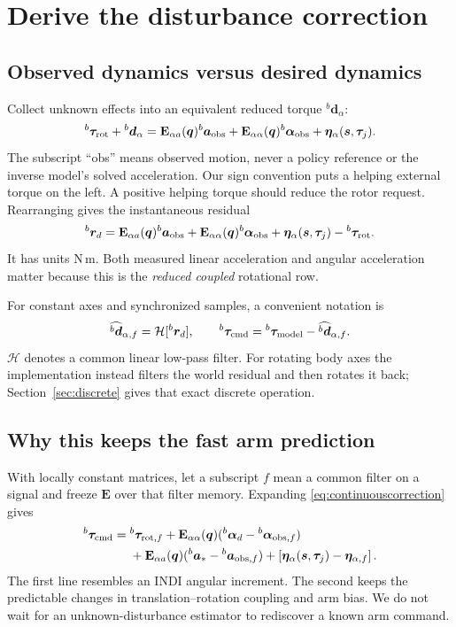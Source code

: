 \documentclass[11pt,a4paper]{article}
\newcommand{\vct}[1]{\boldsymbol{#1}}
\newcommand{\mat}[1]{\mathbf{#1}}
\newcommand{\bv}[1]{{}^{b}\vct{#1}}
\begin{document}
\section{Derive the disturbance correction}\label{sec:residual}

\subsection{Observed dynamics versus desired dynamics}
Collect unknown effects into an equivalent reduced torque $\bv d_\alpha$:
\begin{equation}
\bv\tau_{\rm rot}+\bv d_\alpha=
\mat E_{\alpha a}(\vct q)\bv a_{\rm obs}
+\mat E_{\alpha\alpha}(\vct q)\bv\alpha_{\rm obs}
+\vct\eta_\alpha(\vct s,\vct\tau_j).
\label{eq:observedbalance}
\end{equation}
The subscript ``obs'' means observed motion, never a policy reference or the
inverse model's solved acceleration. Our sign convention puts a helping external
torque on the left. A positive helping torque should reduce the rotor request.
Rearranging gives the instantaneous residual
\begin{equation}
\bv r_d=
\mat E_{\alpha a}(\vct q)\bv a_{\rm obs}
+\mat E_{\alpha\alpha}(\vct q)\bv\alpha_{\rm obs}
+\vct\eta_\alpha(\vct s,\vct\tau_j)-\bv\tau_{\rm rot}.
\label{eq:rawcontinuous}
\end{equation}
It has units N\,m. Both measured linear acceleration and angular acceleration
matter because this is the \emph{reduced coupled} rotational row.

For constant axes and synchronized samples, a convenient notation is
\begin{equation}
\widehat{\bv d}_{\alpha,f}=\mathcal H[\bv r_d],\qquad
\bv\tau_{\rm cmd}=\bv\tau_{\rm model}-\widehat{\bv d}_{\alpha,f}.
\label{eq:continuouscorrection}
\end{equation}
$\mathcal H$ denotes a common linear low-pass filter. For rotating body axes the
implementation instead filters the world residual and then rotates it back;
Section~\ref{sec:discrete} gives that exact discrete operation.

\subsection{Why this keeps the fast arm prediction}
With locally constant matrices, let a subscript $f$ mean a common filter on a
signal and freeze $\mat E$ over that filter memory. Expanding
\eqref{eq:continuouscorrection} gives
\begin{equation}
\begin{aligned}
\bv\tau_{\rm cmd}={}&\bv\tau_{{\rm rot},f}
+\mat E_{\alpha\alpha}(\vct q)
(\bv\alpha_d-\bv\alpha_{{\rm obs},f})\\
&+\mat E_{\alpha a}(\vct q)(\bv a_*-\bv a_{{\rm obs},f})
+\left[\vct\eta_\alpha(\vct s,\vct\tau_j)
-\vct\eta_{\alpha,f}\right].
\end{aligned}\label{eq:expanded}
\end{equation}
The first line resembles an INDI angular increment. The second keeps the
predictable changes in translation--rotation coupling and arm bias. We do not
wait for an unknown-disturbance estimator to rediscover a known arm command.
\end{document}
